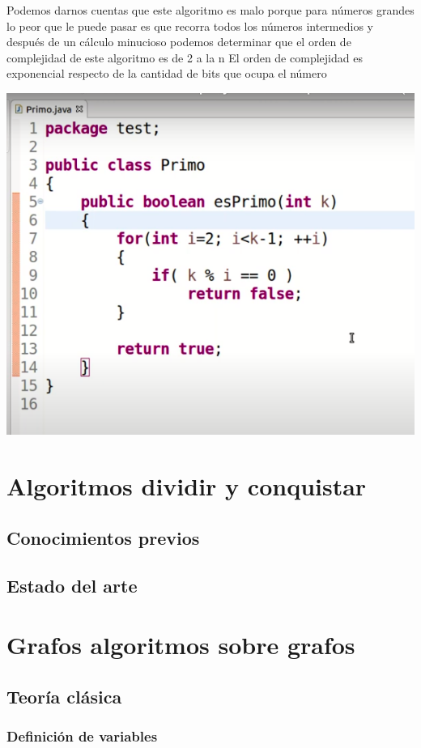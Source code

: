 \documentclass[12pt]{book}
\begin{document}
Podemos darnos cuentas que este algoritmo es malo porque para números grandes lo peor que le puede pasar es que recorra todos los números intermedios y después de un cálculo minucioso 
podemos determinar que el orden de complejidad de este algoritmo es de 2 a la n
El orden de complejidad es exponencial respecto de la cantidad de bits que ocupa el número




\includegraphics[scale=.4]{./image/primo.png}



\chapter{Algoritmos dividir y conquistar}
\section{Conocimientos previos}
\section{Estado del arte}
\chapter{Grafos algoritmos sobre grafos}
\section{Teoría clásica}
\subsection{Definición de variables}
\end{document}
